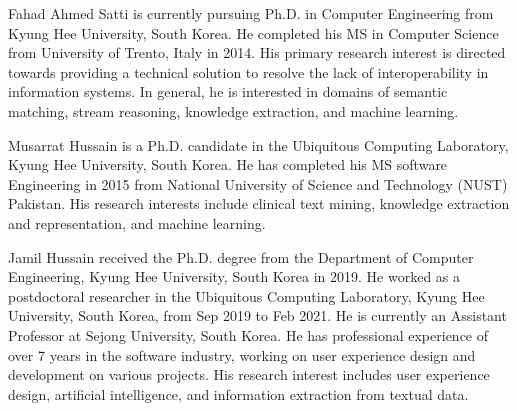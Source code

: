 \documentclass{ieeeaccess}
\begin{document}
\begin{IEEEbiography}{Fahad Ahmed Satti} is currently pursuing Ph.D. in Computer Engineering from Kyung Hee University, South Korea. He completed his MS in Computer Science from University of Trento, Italy in 2014. His primary research interest is directed towards providing a technical solution to resolve the lack of interoperability in information systems. In general, he is interested in domains of semantic matching, stream reasoning, knowledge extraction, and machine learning.
\end{IEEEbiography}
\begin{IEEEbiography}{Musarrat Hussain} is a Ph.D. candidate in the Ubiquitous Computing Laboratory, Kyung Hee University, 	South Korea. He has completed his MS software Engineering in 2015 from National University of Science 	and Technology (NUST) Pakistan. His research interests include clinical text mining, knowledge 	extraction and representation, and machine learning.
\end{IEEEbiography}
\begin{IEEEbiography}{Jamil Hussain} received the Ph.D. degree from the Department of Computer Engineering, Kyung Hee University, South Korea in 2019. He worked as a postdoctoral researcher in the Ubiquitous Computing Laboratory, Kyung Hee University, South Korea, from Sep 2019 to Feb 2021. He is currently an Assistant Professor at Sejong University, South Korea. He has professional experience of over 7 years in the software industry, working on user experience design and development on various projects. His research interest includes user experience design, artificial intelligence, and information extraction from textual data.
\end{IEEEbiography}
\end{document}
